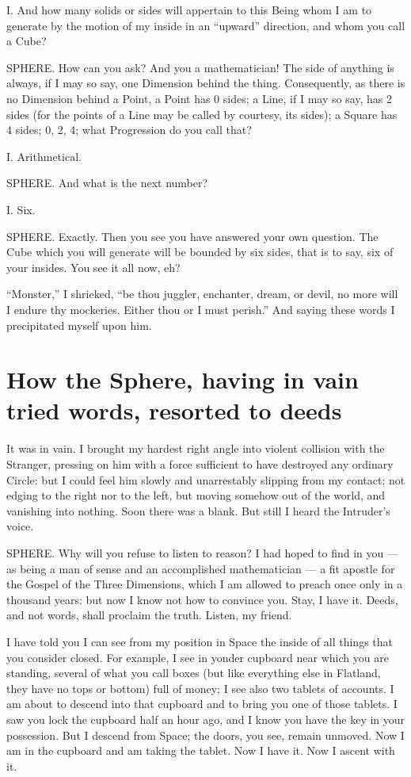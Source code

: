 \documentclass[12pt, a4paper, twoside]{memoir}
\begin{document}
I. And how many solids or sides will appertain to this Being whom I am to
generate by the motion of my inside in an ``upward'' direction, and whom you
call a Cube?

SPHERE. How can you ask? And you a mathematician! The side of anything is
always, if I may so say, one Dimension behind the thing. Consequently, as
there is no Dimension behind a Point, a Point has 0 sides; a Line, if I may so
say, has 2 sides (for the points of a Line may be called by courtesy, its
sides); a Square has 4 sides; 0, 2, 4; what Progression do you call that?

I. Arithmetical.

SPHERE. And what is the next number?

I. Six.

SPHERE. Exactly. Then you see you have answered your own question. The Cube
which you will generate will be bounded by six sides, that is to say, six of
your insides. You see it all now, eh?

``Monster,'' I shrieked, ``be thou juggler, enchanter, dream, or devil, no more
will I endure thy mockeries. Either thou or I must perish.'' And saying these
words I precipitated myself upon him.



\chapter{How the Sphere, having in vain
tried words, resorted to deeds}
It was in vain. I brought my hardest right angle into violent collision with
the Stranger, pressing on him with a force sufficient to have destroyed any
ordinary Circle: but I could feel him slowly and unarrestably slipping from my
contact; not edging to the right nor to the left, but moving somehow out of
the world, and vanishing into nothing. Soon there was a blank. But still I
heard the Intruder's voice.

SPHERE. Why will you refuse to listen to reason? I had hoped to find in you ---
as being a man of sense and an accomplished mathematician --- a fit apostle for
the Gospel of the Three Dimensions, which I am allowed to preach once only in
a thousand years: but now I know not how to convince you. Stay, I have it.
Deeds, and not words, shall proclaim the truth. Listen, my friend.

I have told you I can see from my position in Space the inside of all things
that you consider closed. For example, I see in yonder cupboard near which you
are standing, several of what you call boxes (but like everything else in
Flatland, they have no tops or bottom) full of money; I see also two tablets
of accounts. I am about to descend into that cupboard and to bring you one of
those tablets. I saw you lock the cupboard half an hour ago, and I know you
have the key in your possession. But I descend from Space; the doors, you see,
remain unmoved. Now I am in the cupboard and am taking the tablet. Now I have
it. Now I ascent with it.
\end{document}
